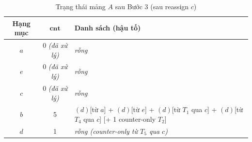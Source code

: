 \documentclass[12pt,a4paper]{report}
\begin{document}
\medskip
 
\begin{table}[H]
  \centering
  \caption{Trạng thái mảng $A$ sau Bước 3 (sau reassign $c$)}
  \label{tab:ex1-after3}
  \begin{tabular}{ccl}
    \toprule
    \textbf{Hạng mục} & $\mathbf{cnt}$ & \textbf{Danh sách (hậu tố)} \\
    \midrule
    $a$ & 0 \textit{(đã xử lý)} & \textit{rỗng} \\
    $e$ & 0 \textit{(đã xử lý)} & \textit{rỗng} \\
    $c$ & 0 \textit{(đã xử lý)} & \textit{rỗng} \\
    $b$ & 5 & $(d)$[từ $a$] + $(d)$[từ $e$] + $(d)$[từ $T_1$ qua $c$] + $(d)$[từ $T_4$ qua $c$] [+ 1 counter-only $T_2$] \\
    $d$ & 1 & \textit{rỗng (counter-only từ $T_5$ qua $c$)} \\
    \bottomrule
  \end{tabular}
\end{table}
 
\medskip
 
\end{document}
